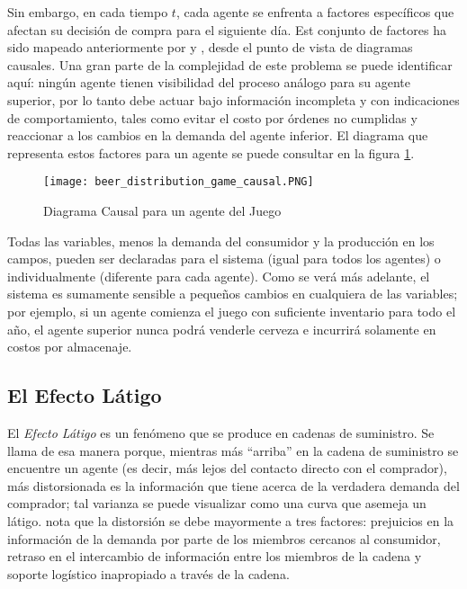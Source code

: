 Sin embargo, en cada tiempo $t$, cada agente se enfrenta a factores espec\'ificos que afectan su decisi\'on de compra para el siguiente d\'ia. Est conjunto de factores ha sido mapeado anteriormente por \citet{Duggan} y \citet{Grasl}, desde el punto de vista de diagramas causales. Una gran parte de la complejidad de este problema se puede identificar aqu\'i: ning\'un agente tienen visibilidad del proceso an\'alogo para su agente superior, por lo tanto debe actuar bajo informaci\'on incompleta y con indicaciones de comportamiento, tales como evitar el costo por \'ordenes no cumplidas y reaccionar a los cambios en la demanda del agente inferior. El diagrama que representa estos factores para un agente se puede consultar en la figura \ref{causal}.

\begin{figure}[ht]
\caption{Diagrama Causal para un agente del Juego}
\label{causal}
\texttt{[image: beer\_distribution\_game\_causal.PNG]}
\centering
\end{figure}

Todas las variables, menos la demanda del consumidor y la producci\'on en los campos, pueden ser declaradas para el sistema (igual para todos los agentes) o individualmente (diferente para cada agente). Como se ver\'a m\'as adelante, el sistema es sumamente sensible a peque\~nos cambios en cualquiera de las variables; por ejemplo, si un agente comienza el juego con suficiente inventario para todo el a\~no, el agente superior nunca podr\'a venderle cerveza e incurrir\'a solamente en costos por almacenaje.

\subsection{El Efecto Látigo}

El \textit{Efecto Látigo} es un fen\'omeno que se produce en cadenas de suministro. Se llama de esa manera porque, mientras m\'as ``arriba'' en la cadena de suministro se encuentre un agente (es decir, m\'as lejos del contacto directo con el comprador), m\'as distorsionada es la informaci\'on que tiene acerca de la verdadera demanda del comprador; tal varianza se puede visualizar como una curva que asemeja un l\'atigo. \citet{Chaharsooghi} nota que la distorsi\'on se debe mayormente a tres factores: prejuicios en la informaci\'on de la demanda por parte de los miembros cercanos al consumidor, retraso en el intercambio de informaci\'on entre los miembros de la cadena y soporte log\'istico inapropiado a trav\'es de la cadena. \\

